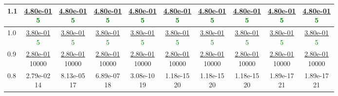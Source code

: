 \begin{table}[H]
\begin{tabular}{|l||c|c|c|c|c|c|c|c|c|}
\hline
 1.1 & \makecell{\ul{4.80e-01} \\ \textcolor{Green}{5}} & \makecell{\ul{4.80e-01} \\ \textcolor{Green}{5}} & \makecell{\ul{4.80e-01} \\ \textcolor{Green}{5}} & \makecell{\ul{4.80e-01} \\ \textcolor{Green}{5}} & \makecell{\ul{4.80e-01} \\ \textcolor{Green}{5}} & \makecell{\ul{4.80e-01} \\ \textcolor{Green}{5}} & \makecell{\ul{4.80e-01} \\ \textcolor{Green}{5}} & \makecell{\ul{4.80e-01} \\ \textcolor{Green}{5}} & \makecell{\ul{4.80e-01} \\ \textcolor{Green}{5}} \\
\hline
 1.0 & \makecell{\ul{3.80e-01} \\ \textcolor{Green}{5}} & \makecell{\ul{3.80e-01} \\ \textcolor{Green}{5}} & \makecell{\ul{3.80e-01} \\ \textcolor{Green}{5}} & \makecell{\ul{3.80e-01} \\ \textcolor{Green}{5}} & \makecell{\ul{3.80e-01} \\ \textcolor{Green}{5}} & \makecell{\ul{3.80e-01} \\ \textcolor{Green}{5}} & \makecell{\ul{3.80e-01} \\ \textcolor{Green}{5}} & \makecell{\ul{3.80e-01} \\ \textcolor{Green}{5}} & \makecell{\ul{3.80e-01} \\ \textcolor{Green}{5}} \\
\hline
 0.9 & \makecell{\ul{2.80e-01} \\ 10000} & \makecell{\ul{2.80e-01} \\ 10000} & \makecell{\ul{2.80e-01} \\ 10000} & \makecell{\ul{2.80e-01} \\ 10000} & \makecell{\ul{2.80e-01} \\ 10000} & \makecell{\ul{2.80e-01} \\ 10000} & \makecell{\ul{2.80e-01} \\ 10000} & \makecell{\ul{2.80e-01} \\ 10000} & \makecell{\ul{2.80e-01} \\ 10000} \\
\hline
 0.8 & \makecell{2.79e-02 \\ 14} & \makecell{8.13e-05 \\ 17} & \makecell{6.89e-07 \\ 18} & \makecell{3.08e-10 \\ 19} & \makecell{1.18e-15 \\ 20} & \makecell{1.18e-15 \\ 20} & \makecell{1.18e-15 \\ 20} & \makecell{1.89e-17 \\ 21} & \makecell{1.89e-17 \\ 21} \\

\end{tabular}
\end{table}
